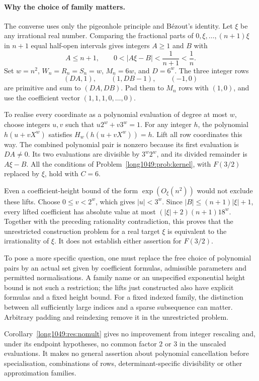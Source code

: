 \documentclass[11pt]{article}
\begin{document}
\paragraph{Why the choice of family matters.}
The converse uses only the pigeonhole principle and B\'ezout's identity.
Let $\xi$ be any irrational real number. Comparing the fractional parts
of $0,\xi,\ldots,(n+1)\xi$ in $n+1$ equal half-open intervals gives
integers $A\ge1$ and $B$ with
\[
 A\le n+1,\qquad 0<|A\xi-B|<\frac1{n+1}<\frac1n.
\]
Set $w=n^2$, $W_n=R_n=S_n=w$, $M_n=6w$, and $D=6^w$.
The three integer rows
\[
 (DA,1),\qquad (1,DB-1),\qquad (-1,0)
\]
are primitive and sum to $(DA,DB)$. Pad them to $M_n$ rows with
$(1,0)$, and use the coefficient vector $(1,1,1,0,\ldots,0)$.

To realise every coordinate as a polynomial evaluation of degree at
most $w$, choose integers $u,v$ such that $u2^w+v3^w=1$. For any
integer $h$, the polynomial $h(u+vX^w)$ satisfies
$H_w(h(u+vX^w))=h$. Lift all row coordinates this way.
The combined polynomial pair is nonzero because its first evaluation
is $DA\ne0$. Its two evaluations are divisible by $3^w2^w$, and its
divided remainder is $A\xi-B$. All the conditions of
Problem~\ref{long1049:prob:kernel}, with $F(3/2)$ replaced by $\xi$,
hold with $C=6$.

Even a coefficient-height bound of the form $\exp(O_\xi(n^2))$ would
not exclude these lifts. Choose $0\le v<2^w$, which gives $|u|<3^w$.
Since $|B|\le(n+1)|\xi|+1$, every lifted coefficient has absolute value
at most $(|\xi|+2)(n+1)18^w$.
Together with the preceding rationality contradiction, this proves that
the unrestricted construction problem for a real target $\xi$ is
equivalent to the irrationality of $\xi$. It does not establish either
assertion for $F(3/2)$.

To pose a more specific question, one must replace the free choice of
polynomial pairs by an actual set given by coefficient formulas,
admissible parameters and permitted normalisations. A family name or
an unspecified exponential height bound is not such a restriction;
the lifts just constructed also have explicit formulas and a fixed
height bound. For a fixed indexed family, the distinction between all
sufficiently large indices and a sparse subsequence can matter.
Arbitrary padding and reindexing remove it in the unrestricted problem.


Corollary~\ref{long1049:res:nomult} gives no improvement from integer
rescaling and, under its endpoint hypotheses, no common factor $2$ or
$3$ in the unscaled evaluations. It makes no general assertion about
polynomial cancellation before specialisation, combinations of rows,
determinant-specific divisibility or other approximation families.
\end{document}

